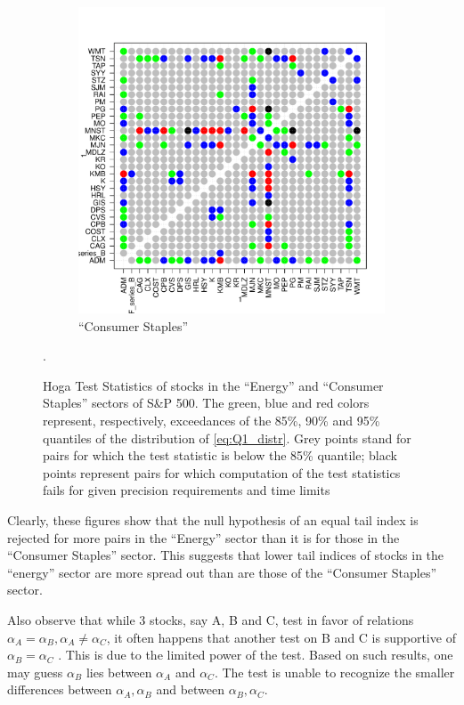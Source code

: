 \documentclass{article}
\begin{document}
\begin{figure}[htb!]
\begin{subfigure}[b]{0.5\linewidth}
    \includegraphics[width=\textwidth]{Hoga_Consumer_Staples_pair.pdf}
    \caption{``Consumer Staples''}
    \label{fig:Hoga_consumer_Staples_pair}
  \end{subfigure}
  \caption{Hoga Test Statistics of stocks in the ``Energy'' and
    ``Consumer Staples'' sectors of
    S\&P 500. The green, blue and red colors represent, respectively,
    exceedances of the 85\%, 90\% and 95\% quantiles of the distribution of
    \eqref{eq:Q1_distr}.
    Grey points stand for pairs for which the test statistic is below
    the 85\% quantile;
    black points represent pairs for which
    computation of the test statistics fails for given precision
    requirements and time limits}.
\end{figure}
Clearly, these figures show that the null
hypothesis of an equal tail index is rejected for more pairs in the
``Energy'' sector than it is for those in the ``Consumer Staples''
sector. This suggests that lower tail indices of stocks in the
``energy'' sector are more spread out than are those of the ``Consumer
Staples'' sector.

Also observe that while 3 stocks, say A, B and C, test in favor of
relations $\alpha_A = \alpha_B, \alpha_A \neq \alpha_C$, it often
happens that another test on B and C is supportive of $\alpha_B =
\alpha_C$ . This is due to the limited power of the test. Based
on such results, one may guess $\alpha_B$ lies between $\alpha_A$ and
$\alpha_C$. The test is unable to recognize the smaller differences
between $\alpha_A, \alpha_B$ and between $\alpha_B, \alpha_C$.
\end{document}
